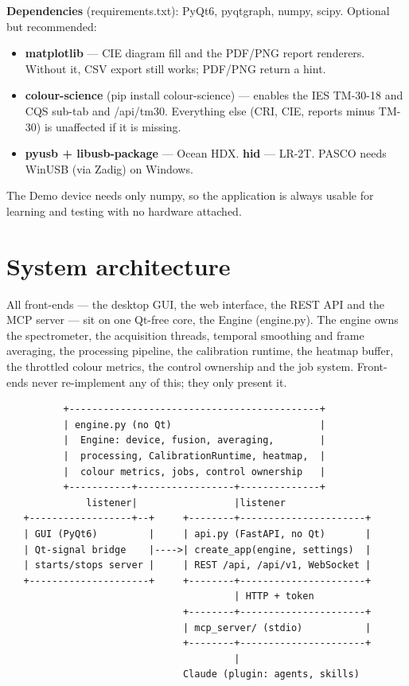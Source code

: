 \documentclass[12pt,a4paper]{article}
\DeclareRobustCommand{\code}[1]{{\ttfamily\small\def\_{\rawus\allowbreak}#1}}
\DeclareRobustCommand{\file}[1]{{\ttfamily\small\def\_{\rawus\allowbreak}#1}}
\begin{document}
\textbf{Dependencies} (\file{requirements.txt}): PyQt6, pyqtgraph, numpy, scipy.
Optional but recommended:
\begin{itemize}
  \item \textbf{matplotlib} --- CIE diagram fill and the PDF/PNG report renderers.
        Without it, CSV export still works; PDF/PNG return a hint.
  \item \textbf{colour-science} (\code{pip install colour-science}) --- enables the
        IES TM-30-18 and CQS sub-tab and \code{/api/tm30}. Everything else
        (CRI, CIE, reports minus TM-30) is unaffected if it is missing.
  \item \textbf{pyusb + libusb-package} --- Ocean HDX. \textbf{hid} --- LR-2T.
        PASCO needs WinUSB (via Zadig) on Windows.
\end{itemize}
The Demo device needs only numpy, so the application is always usable for
learning and testing with no hardware attached.

\section{System architecture}\label{sec:architecture}
All front-ends --- the desktop GUI, the web interface, the REST API and the MCP
server --- sit on one Qt-free core, the \code{Engine} (\file{engine.py}). The
engine owns the spectrometer, the acquisition threads, temporal smoothing and
frame averaging, the processing pipeline, the calibration runtime, the heatmap
buffer, the throttled colour metrics, the control ownership and the job system.
Front-ends never re-implement any of this; they only present it.

{\footnotesize
\begin{verbatim}
          +--------------------------------------------+
          | engine.py (no Qt)                          |
          |  Engine: device, fusion, averaging,        |
          |  processing, CalibrationRuntime, heatmap,  |
          |  colour metrics, jobs, control ownership   |
          +-----------+-----------------+--------------+
              listener|                 |listener
   +------------------+--+     +--------+----------------------+
   | GUI (PyQt6)         |     | api.py (FastAPI, no Qt)       |
   | Qt-signal bridge    |---->| create_app(engine, settings)  |
   | starts/stops server |     | REST /api, /api/v1, WebSocket |
   +---------------------+     +--------+----------------------+
                                        | HTTP + token
                               +--------+----------------------+
                               | mcp_server/ (stdio)           |
                               +--------+----------------------+
                                        |
                               Claude (plugin: agents, skills)
\end{verbatim}}
\end{document}
